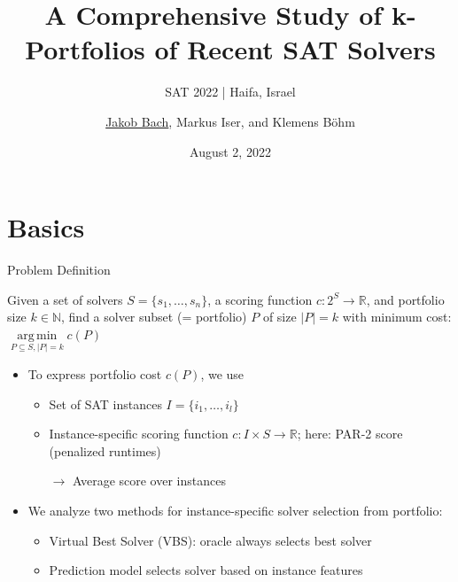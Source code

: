 \documentclass[en]{sdqbeamer}
\title[A Comprehensive Study of k-Portfolios of Recent SAT Solvers]{A Comprehensive Study of k-Portfolios of Recent SAT Solvers} %
\subtitle{SAT 2022 | Haifa, Israel}
\author[\underline{Jakob Bach}, Markus Iser, and Klemens Böhm]{\underline{Jakob Bach}, Markus Iser, and Klemens Böhm} %
\date[2022-08-02]{August 2, 2022} %
\DeclareMathOperator*{\argmin}{arg\,min}
\begin{document}
\KITtitleframe

\section{Basics}

\begin{frame}[t]{Problem Definition}
	\begin{definition}
		Given a set of solvers $S = \{s_1, \dots, s_n\}$,
		a scoring function $c: 2^S \rightarrow \mathbb{R}$,
		and portfolio size $k \in \mathbb{N}$,
		find a solver subset (= portfolio) $P$ of size $|P| = k$ with minimum cost: $\argmin\limits_{P \subseteq S, |P| = k} c(P)$
	\end{definition}
	\pause
	\begin{itemize}
		\item To express portfolio cost $c(P)$, we use
		\begin{itemize}
			\item Set of SAT instances $I = \{i_1, \dots, i_l\}$
			\item Instance-specific scoring function $c: I \times S \rightarrow \mathbb{R}$; here: PAR-2 score (penalized runtimes)
			\item[$\rightarrow$] Average score over instances
		\end{itemize}
		\vspace{\baselineskip}
		\pause
		\item We analyze two methods for instance-specific solver selection from portfolio:
		\begin{itemize}
			\item Virtual Best Solver (VBS): oracle always selects best solver
			\item Prediction model selects solver based on instance features
		\end{itemize}
	\end{itemize}
\end{frame}
\end{document}
